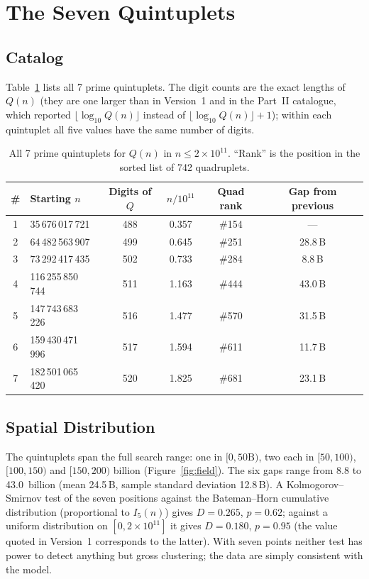﻿\documentclass[11pt,a4paper]{article}
\begin{document}
\section{The Seven Quintuplets}\label{sec:quintuplets}

\subsection{Catalog}

Table~\ref{tab:quints} lists all 7 prime quintuplets.  The digit counts are the
exact lengths of $Q(n)$ (they are one larger than in Version~1 and in the Part~II
catalogue, which reported $\lfloor \log_{10} Q(n) \rfloor$ instead of
$\lfloor \log_{10} Q(n) \rfloor + 1$); within each quintuplet all five values
have the same number of digits.

\begin{table}[H]
\centering
\caption{All 7 prime quintuplets for $Q(n)$ in $n \leq 2 \times 10^{11}$.
``Rank'' is the position in the sorted list of 742 quadruplets.}\label{tab:quints}
\smallskip
\begin{tabular}{clcccc}
\toprule
\# & Starting $n$ & Digits of $Q$ & $n/10^{11}$ & Quad rank & Gap from previous \\
\midrule
1 & 35\,676\,017\,721  & 488 & 0.357 & \#154 & --- \\
2 & 64\,482\,563\,907  & 499 & 0.645 & \#251 & 28.8\,B \\
3 & 73\,292\,417\,435  & 502 & 0.733 & \#284 &  8.8\,B \\
4 & 116\,255\,850\,744 & 511 & 1.163 & \#444 & 43.0\,B \\
5 & 147\,743\,683\,226 & 516 & 1.477 & \#570 & 31.5\,B \\
6 & 159\,430\,471\,996 & 517 & 1.594 & \#611 & 11.7\,B \\
7 & 182\,501\,065\,420 & 520 & 1.825 & \#681 & 23.1\,B \\
\bottomrule
\end{tabular}
\end{table}

\subsection{Spatial Distribution}

The quintuplets span the full search range: one in $[0, 50\text{B})$, two each
in $[50, 100)$, $[100, 150)$ and $[150, 200)$ billion (Figure~\ref{fig:field}).
The six gaps range from 8.8 to 43.0~billion (mean 24.5\,B, sample standard
deviation 12.8\,B).  A Kolmogorov--Smirnov test of the seven positions against
the Bateman--Horn cumulative distribution (proportional to $I_5(n)$) gives
$D = 0.265$, $p = 0.62$; against a uniform distribution on $[0, 2\times10^{11}]$
it gives $D = 0.180$, $p = 0.95$ (the value quoted in Version~1 corresponds to the
latter).  With seven points neither test has power to detect anything but gross
clustering; the data are simply consistent with the model.
\end{document}
